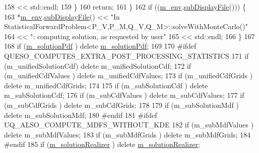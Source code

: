 \begin{DoxyCode}
158                               << std::endl;
159     \}
160     \textcolor{keywordflow}{return};
161   \}
162   \textcolor{keywordflow}{if} ((\hyperlink{class_q_u_e_s_o_1_1_statistical_forward_problem_ab8dc530366735e9ca11290e37f95996a}{m\_env}.\hyperlink{class_q_u_e_s_o_1_1_base_environment_a8a0064746ae8dddfece4229b9ad374d6}{subDisplayFile}())) \{
163     *\hyperlink{class_q_u_e_s_o_1_1_statistical_forward_problem_ab8dc530366735e9ca11290e37f95996a}{m\_env}.\hyperlink{class_q_u_e_s_o_1_1_base_environment_a8a0064746ae8dddfece4229b9ad374d6}{subDisplayFile}() << \textcolor{stringliteral}{"In
       StatisticalForwardProblem<P\_V,P\_M,Q\_V,Q\_M>::solveWithMonteCarlo()"}
164                             << \textcolor{stringliteral}{": computing solution, as requested by user"}
165                             << std::endl;
166   \}
167 
168   \textcolor{keywordflow}{if} (\hyperlink{class_q_u_e_s_o_1_1_statistical_forward_problem_a67810b9d77e549b7eee76cc008e21e5b}{m\_solutionPdf}       ) \textcolor{keyword}{delete} \hyperlink{class_q_u_e_s_o_1_1_statistical_forward_problem_a67810b9d77e549b7eee76cc008e21e5b}{m\_solutionPdf};
169 
170 \textcolor{preprocessor}{#ifdef QUESO\_COMPUTES\_EXTRA\_POST\_PROCESSING\_STATISTICS}
171 \textcolor{preprocessor}{}  \textcolor{keywordflow}{if} (m\_unifiedSolutionCdf) \textcolor{keyword}{delete} m\_unifiedSolutionCdf;
172   \textcolor{keywordflow}{if} (m\_unifiedCdfValues  ) \textcolor{keyword}{delete} m\_unifiedCdfValues;
173   \textcolor{keywordflow}{if} (m\_unifiedCdfGrids   ) \textcolor{keyword}{delete} m\_unifiedCdfGrids;
174 
175   \textcolor{keywordflow}{if} (m\_subSolutionCdf    ) \textcolor{keyword}{delete} m\_subSolutionCdf;
176   \textcolor{keywordflow}{if} (m\_subCdfValues      ) \textcolor{keyword}{delete} m\_subCdfValues;
177   \textcolor{keywordflow}{if} (m\_subCdfGrids       ) \textcolor{keyword}{delete} m\_subCdfGrids;
178 
179   \textcolor{keywordflow}{if} (m\_subSolutionMdf    ) \textcolor{keyword}{delete} m\_subSolutionMdf;
180 \textcolor{preprocessor}{#endif}
181 \textcolor{preprocessor}{}\textcolor{preprocessor}{#ifdef UQ\_ALSO\_COMPUTE\_MDFS\_WITHOUT\_KDE}
182 \textcolor{preprocessor}{}  \textcolor{keywordflow}{if} (m\_subMdfValues      ) \textcolor{keyword}{delete} m\_subMdfValues;
183   \textcolor{keywordflow}{if} (m\_subMdfGrids       ) \textcolor{keyword}{delete} m\_subMdfGrids;
184 \textcolor{preprocessor}{#endif}
185 \textcolor{preprocessor}{}  \textcolor{keywordflow}{if} (\hyperlink{class_q_u_e_s_o_1_1_statistical_forward_problem_a0b855f085c84bd113827951f3c424d2d}{m\_solutionRealizer}  ) \textcolor{keyword}{delete} \hyperlink{class_q_u_e_s_o_1_1_statistical_forward_problem_a0b855f085c84bd113827951f3c424d2d}{m\_solutionRealizer};

\end{DoxyCode}
